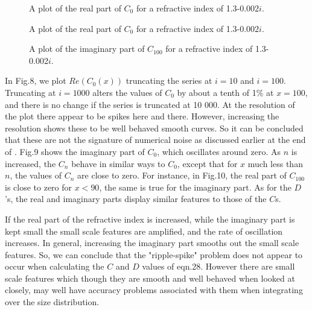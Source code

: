 \documentclass[12pt]{article}
\begin{document}
\vspace*{14cm}
\begin{figure}[htb]
\caption{ A plot of the real part of $C_0$ for a refractive index of
1.3-0.002$i$. }
\end{figure}

\vspace*{14cm}
\begin{figure}[htb]
\caption{ A plot of the real part of $C_0$ for a refractive index of
1.3-0.002$i$. }
\end{figure}
\vspace*{14cm}
\begin{figure}[htb]
\caption{ A plot of the imaginary  part of $C_{100}$ for a refractive index of
1.3-0.002$i$. }
\end{figure}

In Fig.8, we plot $Re(C_0(x))$ truncating the series at $i=10$ and $i=100$.
Truncating at $i=1000$ alters the values of $C_0$ by about a tenth of 1\% at $x=100$,
and there is no change if the series is truncated at 10 000.  At the resolution
of the plot there appear to be spikes here and there. However, increasing the resolution
shows these to be well behaved smooth curves. So it can be concluded that these
are not the signature of numerical noise as discussed earlier at the end of .
 Fig.9 shows the imaginary
part of $C_0$, which oscillates around zero. As $n$ is increased, the $C_n$ behave 
in similar ways to $C_0$, except that for $x$  much less than $n$, the values of
$C_n$ are close to zero. For instance, in Fig.10, the real part of $C_{100}$ is close to zero
for $x <90$, the same is true for the imaginary part. As for the $D$'s, the real
and imaginary parts display similar features to those of the $C$s.

If the real part of the refractive index is increased, while the imaginary part is kept 
small the small scale features are amplified, and the rate of oscillation increases. In 
general, increasing the imaginary part smooths out the small scale features.
So, we can conclude that
the "ripple-spike" problem does not appear to occur when calculating the $C$ and $D$ values
of eqn.28. 
However there are small scale features which though they are smooth and well behaved
 when looked at closely,
may well  have accuracy problems associated with them when integrating over the size distribution.
\end{document}

